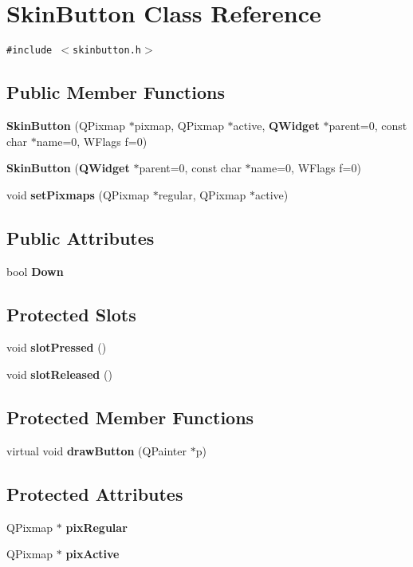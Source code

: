 \section{Skin\-Button Class Reference}
\label{classSkinButton}
{\tt \#include $<$skinbutton.h$>$}

\subsection*{Public Member Functions}
\begin{CompactItemize}
\item 
{\bf Skin\-Button} (QPixmap $\ast$pixmap, QPixmap $\ast$active, {\bf QWidget} $\ast$parent=0, const char $\ast$name=0, WFlags f=0)
\item 
{\bf Skin\-Button} ({\bf QWidget} $\ast$parent=0, const char $\ast$name=0, WFlags f=0)
\item 
void {\bf set\-Pixmaps} (QPixmap $\ast$regular, QPixmap $\ast$active)
\end{CompactItemize}
\subsection*{Public Attributes}
\begin{CompactItemize}
\item 
bool {\bf Down}
\end{CompactItemize}
\subsection*{Protected Slots}
\begin{CompactItemize}
\item 
void {\bf slot\-Pressed} ()
\item 
void {\bf slot\-Released} ()
\end{CompactItemize}
\subsection*{Protected Member Functions}
\begin{CompactItemize}
\item 
virtual void {\bf draw\-Button} (QPainter $\ast$p)
\end{CompactItemize}
\subsection*{Protected Attributes}
\begin{CompactItemize}
\item 
QPixmap $\ast$ {\bf pix\-Regular}
\item 
QPixmap $\ast$ {\bf pix\-Active}
\end{CompactItemize}


